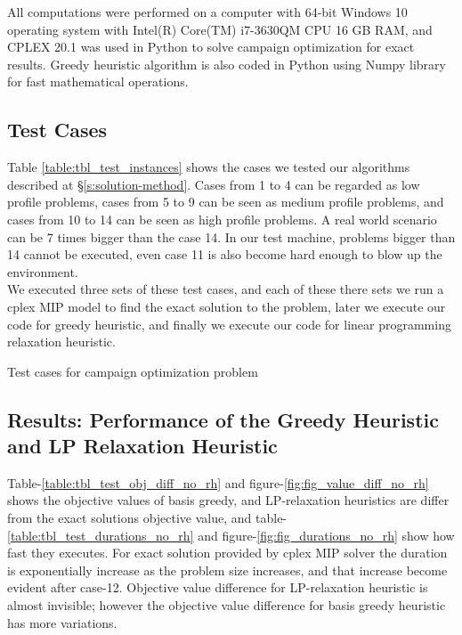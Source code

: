 \documentclass[11pt]{article}
\begin{document}
All computations were performed on a computer with 64-bit Windows 10 operating system with Intel(R) Core(TM) i7-3630QM CPU 16 GB RAM, and CPLEX 20.1 was used in Python to solve campaign optimization for exact results. Greedy heuristic algorithm is also coded in Python using Numpy library for fast mathematical operations.

\subsection{Test Cases} \label{test_cases}
Table \ref{table:tbl_test_instances} shows the cases we tested our algorithms described at \S \ref{s:solution-method}. Cases from 1 to 4 can be regarded as low profile problems, cases from 5 to 9 can be seen as medium profile problems, and cases from 10 to 14 can be seen as high profile problems. A real world scenario can be 7 times bigger than the case 14. In our test machine, problems bigger than 14 cannot be executed, even case 11 is also become hard enough to blow up the environment.\\
We executed three sets of these test cases, and each of these there sets we run a cplex MIP model to find the exact solution to the problem, later we execute our code for greedy heuristic, and finally we execute our code for linear programming relaxation heuristic. 
\begin{table}[htb]
    \centering
    \caption[Short Caption for LoT]{Test cases for campaign optimization problem}\label{table:tbl_test_instances}
\end{table}

\subsection{Results: Performance of the Greedy Heuristic and LP Relaxation Heuristic} \label{test_evaluation}
Table-\ref{table:tbl_test_obj_diff_no_rh} and figure-\ref{fig:fig_value_diff_no_rh} shows the objective values of basis greedy, and LP-relaxation heuristics are differ from the exact solutions objective value, and table-\ref{table:tbl_test_durations_no_rh} and figure-\ref{fig:fig_durations_no_rh} show how fast they executes.
For exact solution provided by cplex MIP solver the duration is exponentially increase as the problem size increases, and that increase become evident after case-12. Objective value difference for LP-relaxation heuristic is almost invisible; however the objective value difference for basis greedy heuristic has more variations.\\
\end{document}
